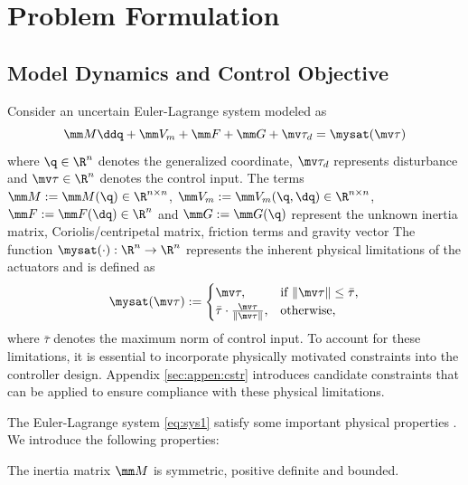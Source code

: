 \documentclass[lettersize,journal]{IEEEtran}
\begin{document}
\section{Problem Formulation}\label{sec:Problem Formulation}

\subsection{Model Dynamics and Control Objective}

Consider an uncertain Euler-Lagrange system modeled as
\begin{equation}
    \mm M\ddq + \mm V_m + \mm F + \mm G + \mv\tau_d
    =
    \mysat(\mv\tau)
    \label{eq:sys1}
\end{equation}
where $\q\in \R^n$ denotes the generalized coordinate, $\mv \tau_d$ represents disturbance and $\mv\tau\in\R^n$ denotes the control input. 
The terms $\mm M:=\mm M(\q)\in\R^{n\times n}$, $\mm V_m:=\mm V_m(\q,\dq)\in\R^{n\times n}$, $\mm F:=\mm F(\dq)\in\R^{n}$ and $\mm G:=\mm G(\q)$ represent the unknown inertia matrix, Coriolis/centripetal matrix, friction terms and gravity vector
The function $\mysat(\cdot):\R^n\to\R^n$ represents the inherent physical limitations of the actuators and is defined as 
\begin{equation}
    \mysat(\mv\tau)
    :=
    \begin{cases}
        \mv\tau, 
        & 
        \text{if } \Vert\mv\tau\Vert\le \bar\tau,
        \\
        \bar\tau
        \cdot
        \tfrac{\mv\tau}{\Vert\mv\tau\Vert}, 
        & 
        \text{otherwise},
    \end{cases}
    \label{eq:sat}
\end{equation}
where $\bar\tau$ denotes the maximum norm of control input.
To account for these limitations, it is essential to incorporate physically motivated constraints into the controller design.
Appendix \ref{sec:appen:cstr} introduces candidate constraints that can be applied to ensure compliance with these physical limitations.

The Euler-Lagrange system \eqref{eq:sys1} satisfy some important physical properties \cite[see, Chap. 3 Tab. 3.2.1]{Lewis:1998aa}.
We introduce the following properties:
\begin{prop} 
    The inertia matrix $\mm M$ is symmetric, positive definite and bounded.
    \label{prop:M}
\end{prop}
\end{document}

